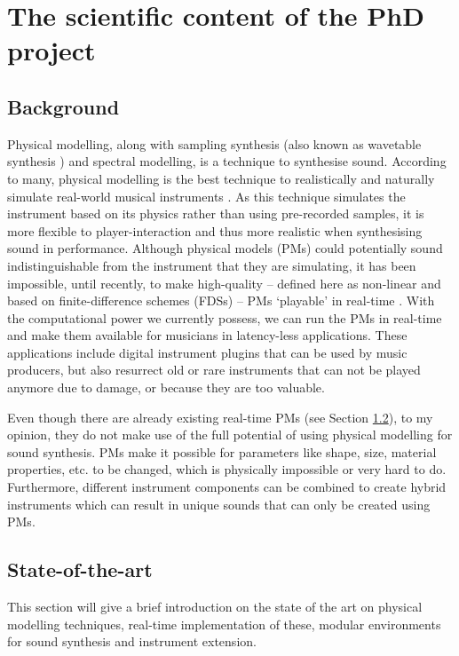 \section{The scientific content of the PhD project}

\subsection{Background}
Physical modelling, along with sampling synthesis (also known as wavetable synthesis \cite{Smith2010a}) and spectral modelling, is a technique to synthesise sound. According to many, physical modelling is the best technique to realistically and naturally simulate real-world musical instruments \cite{Valimaki2006, Smith2010b, Bilbao2009}. As this technique simulates the instrument based on its physics rather than using pre-recorded samples, it is more flexible to player-interaction and thus more realistic when synthesising sound in performance. Although physical models (PMs) could potentially sound indistinguishable from the instrument that they are simulating, it has been impossible, until recently, to make high-quality -- defined here as non-linear and based on finite-difference schemes (FDSs) -- PMs ‘playable’ in real-time \cite{Smith2010a}. With the computational power we currently possess, we can run the PMs in real-time and make them available for musicians in latency-less applications. These applications include digital instrument plugins that can be used by music producers, but also resurrect old or rare instruments that can not be played anymore due to damage, or because they are too valuable. 

Even though there are already existing real-time PMs (see Section \ref{SOTA}), to my opinion, they do not make use of the full potential of using physical modelling for sound synthesis. PMs make it possible for parameters like shape, size, material properties, etc. to be changed, which is physically impossible or very hard to do. Furthermore, different instrument components can be combined to create hybrid instruments which can result in unique sounds that can only be created using PMs.

\subsection{State-of-the-art}\label{SOTA}
This section will give a brief introduction on the state of the art on physical modelling techniques, real-time implementation of these, modular environments for sound synthesis and instrument extension.

